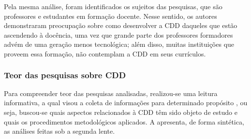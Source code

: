 \documentclass[portuguese]{textolivre}
\begin{document}
Pela mesma análise, foram identificados os sujeitos das pesquisas, que são professores e estudantes em formação docente. Nesse sentido, os autores demonstraram preocupação sobre como desenvolver a CDD daqueles que estão ascendendo à docência, uma vez que grande parte dos professores formadores advém de uma geração menos tecnológica; além disso, muitas instituições que proveem essa formação, não contemplam a CDD em seus currículos.

\subsubsection{Teor das pesquisas sobre CDD}

Para compreender teor das pesquisas analisadas, realizou-se uma leitura informativa, a qual visou a coleta de informações para determinado propósito \cite{lakatos_fundamentos_2003}, ou seja, buscou-se quais aspectos relacionados à CDD têm sido objeto de estudo e quais os procedimentos metodológicos aplicados. A  apresenta, de forma sintética, as análises feitas sob a segunda lente.
\end{document}
